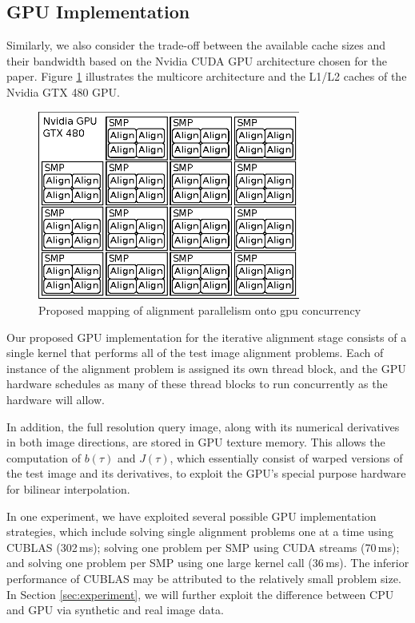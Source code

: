 \documentclass[10pt,twocolumn,letterpaper]{article}
\begin{document}
\subsection{GPU Implementation}
\label{sec:alignment_implementation_gpu}

Similarly, we also consider the trade-off between the available cache sizes and their bandwidth based on the Nvidia CUDA GPU architecture chosen for the paper. Figure \ref{fig:alignment_mapping_gpu} illustrates the multicore architecture and the L1/L2 caches of the Nvidia GTX 480 GPU.
\begin{figure}
\centering
\includegraphics[width=3.4in]{figures/alignment_mapping_gpu}
\caption{Proposed mapping of alignment parallelism onto gpu concurrency}
\label{fig:alignment_mapping_gpu}
\end{figure}

Our proposed GPU implementation for the iterative alignment stage consists of a
single kernel that performs all of the test image alignment problems.  Each of
instance of the alignment problem is assigned its own thread block, and the GPU
hardware schedules as many of these thread blocks to run concurrently as the 
hardware will allow.

In addition, the full resolution query image, along with its numerical derivatives in both
image directions, are stored in GPU texture memory. This  allows the
computation of $b(\tau)$ and $J(\tau)$, which essentially consist of warped
versions of the test image and its derivatives, to exploit the GPU's special
purpose hardware for bilinear interpolation.

In one experiment, we have exploited several possible GPU implementation strategies, which include
solving single alignment problems one at a time using CUBLAS (302\,ms); solving one problem
per SMP using CUDA streams (70\,ms); and solving one problem per SMP using one large kernel call
 (36\,ms). The inferior performance of CUBLAS may be attributed to the relatively small problem
 size. In Section \ref{sec:experiment}, we will further exploit the difference between CPU and GPU
 via synthetic and real image data.
\end{document}
